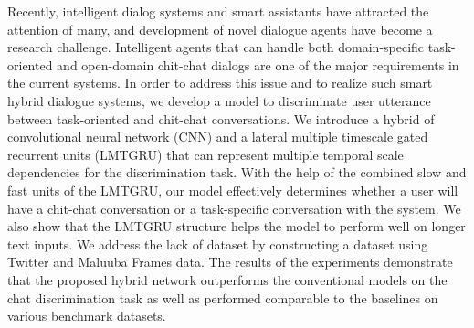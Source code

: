 Recently, intelligent dialog systems and smart assistants have attracted the attention of many, and development of novel dialogue agents have become a research challenge. Intelligent agents that can handle both domain-specific task-oriented and open-domain chit-chat dialogs are one of the major requirements in the current systems. In order to address this issue and to realize such smart hybrid dialogue systems, we develop a model to discriminate user utterance between task-oriented and chit-chat conversations. We introduce a hybrid of convolutional neural network (CNN) and a lateral multiple timescale gated recurrent units (LMTGRU) that can represent multiple temporal scale dependencies for the discrimination task. With the help of the combined slow and fast units of the LMTGRU, our model effectively determines whether a user will have a chit-chat conversation or a task-specific conversation with the system. We also show that the LMTGRU structure helps the model to perform well on longer text inputs. We address the lack of dataset by constructing a dataset using Twitter and Maluuba Frames data. The results of the experiments demonstrate that the proposed hybrid network outperforms the conventional models on the chat discrimination task as well as performed comparable to the baselines on various benchmark datasets.
